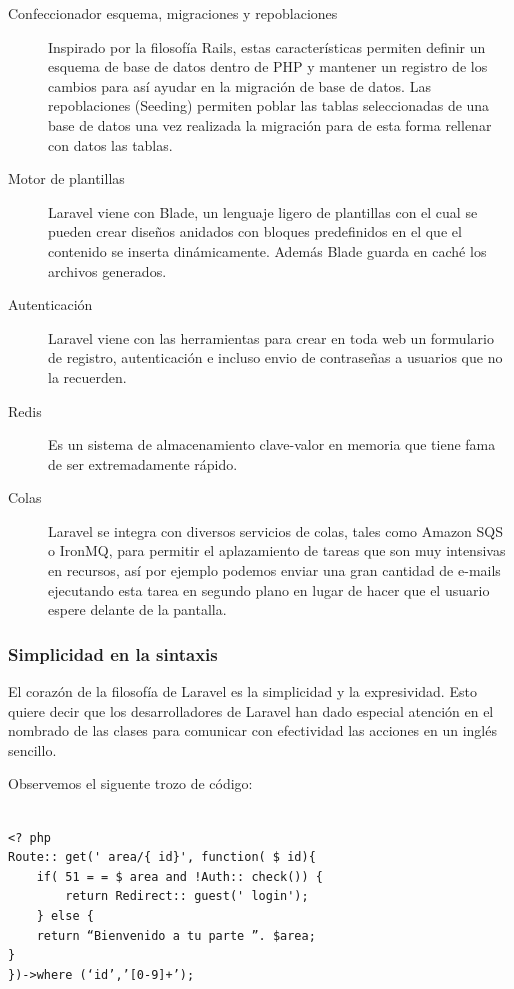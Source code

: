 \begin{description}
    \item[Confeccionador esquema, migraciones y repoblaciones] Inspirado por la filosofía Rails, estas características permiten definir un esquema de base de datos dentro de PHP y mantener un registro de los cambios para así ayudar en la migración de base de datos. Las repoblaciones (Seeding) permiten poblar las tablas seleccionadas de una base de datos una vez realizada la migración para de esta forma rellenar con datos las tablas.
    
    \item[Motor de plantillas] Laravel viene con Blade, un lenguaje ligero de plantillas con el cual se pueden crear diseños anidados con bloques predefinidos en el que el contenido se inserta dinámicamente. Además Blade guarda en caché los archivos generados.
    
    \item[Autenticación] Laravel viene con las herramientas para crear en toda web un formulario de registro, autenticación e incluso envio de contraseñas a usuarios que no la recuerden.
    
    \item[Redis] Es un sistema de almacenamiento clave-valor en memoria que tiene fama de ser extremadamente rápido.
    \item[Colas] Laravel se integra con diversos servicios de colas, tales como Amazon SQS o IronMQ, para permitir el aplazamiento de tareas que son muy intensivas en recursos, así por ejemplo podemos enviar una gran cantidad de e-mails ejecutando esta tarea en segundo plano en lugar de hacer que el usuario espere delante de la pantalla.
\end{description}

\subsubsection{Simplicidad en la sintaxis}

El corazón de la filosofía de Laravel es la simplicidad y la expresividad. Esto quiere decir que los desarrolladores de Laravel han dado especial atención en el nombrado de las clases para comunicar con efectividad las acciones en un inglés sencillo.

Observemos el siguente trozo de código:

\begin{verbatim}

<? php
Route:: get(' area/{ id}', function( $ id){
    if( 51 = = $ area and !Auth:: check()) {
        return Redirect:: guest(' login');
    } else {
    return “Bienvenido a tu parte ”. $area;
}
})->where (‘id’,’[0-9]+’);

\end{verbatim}

